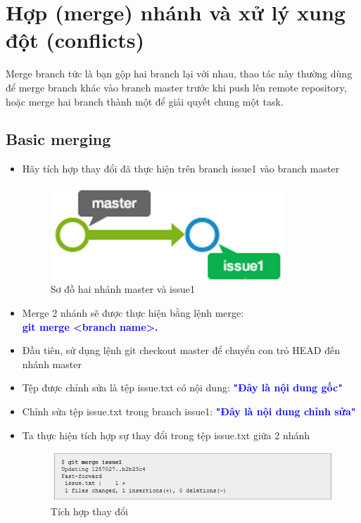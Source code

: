\documentclass[12pt,a4paper]{report}
\begin{document}
\section{Hợp (merge) nhánh và xử lý xung đột (conflicts)}

Merge branch tức là bạn gộp hai branch lại với nhau, thao tác này thường dùng để merge branch khác vào branch master trước khi push lên remote repository, hoặc merge hai branch thành một để giải quyết chung một task.	
\subsection{Basic merging}
\begin{itemize}
 \item Hãy tích hợp thay đổi đã thực hiện trên branch issue1 vào branch master

\begin{figure}[!ht]
	\centering
	\includegraphics[width=0.4\linewidth]{screenshot060}
\caption{Sơ đồ hai nhánh master và issue1}
	\label{fig:screenshot060}	
\end{figure}

\item Merge 2 nhánh sẽ được thực hiện bằng lệnh merge:\\ \textcolor{blue}{\bf git merge <branch name>.}
\item Đầu tiên, sử dụng lệnh git checkout master để chuyển con trỏ HEAD đến nhánh master	
\item Tệp được chỉnh sửa là tệp issue.txt có nội dung: \textcolor{blue}{\bf "Đây là nội dung gốc"}	
\item Chỉnh sửa tệp issue.txt trong branch issue1: \textcolor{blue}{\bf "Đây là nội dung chỉnh sửa"}
\item Ta thực hiện tích hợp sự thay đổi trong tệp issue.txt giữa 2 nhánh

\begin{figure}[!ht]
	\centering	
	\includegraphics[width=0.8\linewidth]{screenshot01}
\caption{Tích hợp thay đổi}
	\label{fig:screenshot01}
\end{figure}


\end{itemize}
\end{document}
